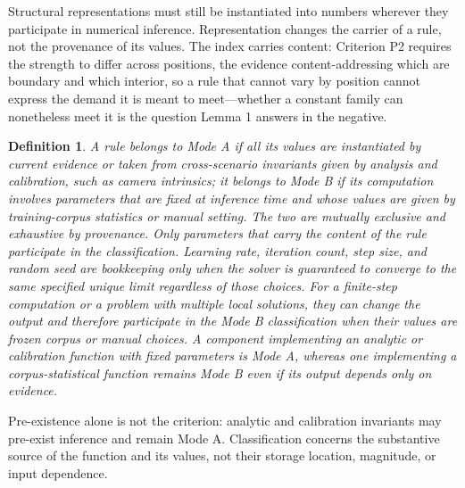 \documentclass[twoside,11pt]{article}
\newtheorem{defn}{Definition}
\begin{document}
Structural representations must still be instantiated into numbers wherever they participate in numerical inference. Representation changes the carrier of a rule, not the provenance of its values. The index carries content: Criterion P2 requires the strength to differ across positions, the evidence content-addressing which are boundary and which interior, so a rule that cannot vary by position cannot express the demand it is meant to meet---whether a constant family can nonetheless meet it is the question Lemma 1 answers in the negative.

\begin{defn}
A rule belongs to \emph{Mode A} if all its values are instantiated by current evidence or taken from cross-scenario invariants given by analysis and calibration, such as camera intrinsics; it belongs to \emph{Mode B} if its computation involves parameters that are fixed at inference time and whose values are given by training-corpus statistics or manual setting. The two are mutually exclusive and exhaustive by provenance. Only parameters that carry the content of the rule participate in the classification. Learning rate, iteration count, step size, and random seed are bookkeeping only when the solver is guaranteed to converge to the same specified unique limit regardless of those choices. For a finite-step computation or a problem with multiple local solutions, they can change the output and therefore participate in the Mode B classification when their values are frozen corpus or manual choices. A component implementing an analytic or calibration function with fixed parameters is Mode A, whereas one implementing a corpus-statistical function remains Mode B even if its output depends only on evidence.
\end{defn}

Pre-existence alone is not the criterion: analytic and calibration invariants may pre-exist inference and remain Mode A. Classification concerns the substantive source of the function and its values, not their storage location, magnitude, or input dependence.
\end{document}
